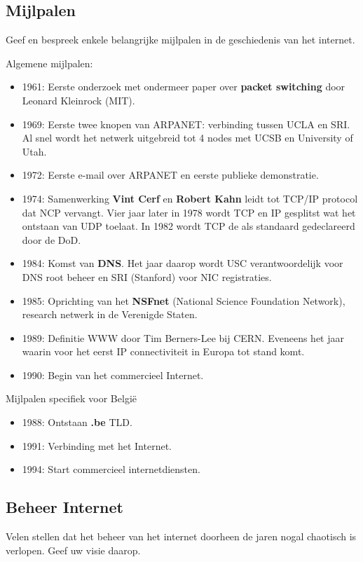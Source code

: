 \documentclass[../main.tex]{subfiles}
\begin{document}
\subsection{Mijlpalen}
\begin{question}
Geef en bespreek enkele belangrijke mijlpalen in de geschiedenis van het internet.
\end{question}

\begin{solution}
Algemene mijlpalen:
\begin{itemize}
	\item 1961: Eerste onderzoek met ondermeer paper over \textbf{packet switching} door Leonard Kleinrock (MIT).
	\item 1969: Eerste twee knopen van ARPANET: verbinding tussen UCLA en SRI. Al snel wordt het netwerk uitgebreid tot 4 nodes met UCSB en University of Utah.
	\item 1972: Eerste e-mail over ARPANET en eerste publieke demonstratie.
	\item 1974: Samenwerking \textbf{Vint Cerf} en \textbf{Robert Kahn} leidt tot TCP/IP protocol dat NCP vervangt. Vier jaar later in 1978 wordt TCP en IP gesplitst wat het ontstaan van UDP toelaat. In 1982 wordt TCP de als standaard gedeclareerd door de DoD.
	\item 1984: Komst van \textbf{DNS}. Het jaar daarop wordt USC verantwoordelijk voor DNS root beheer en SRI (Stanford) voor NIC registraties.
	\item 1985: Oprichting van het \textbf{NSFnet} (National Science Foundation Network), research netwerk in de Verenigde Staten.
	\item 1989: Definitie WWW door Tim Berners-Lee bij CERN. Eveneens het jaar waarin voor het eerst IP connectiviteit in Europa tot stand komt.
	\item 1990: Begin van het commercieel Internet.
\end{itemize}
Mijlpalen specifiek voor Belgi\"e
\begin{itemize}
	\item 1988: Ontstaan \textbf{.be} TLD.
	\item 1991: Verbinding met het Internet.
	\item 1994: Start commercieel internetdiensten.
\end{itemize}
\end{solution}


\subsection{Beheer Internet}
\begin{question}
Velen stellen dat het beheer van het internet doorheen de jaren nogal chaotisch is
verlopen. Geef uw visie daarop.
\end{question}
\end{document}
